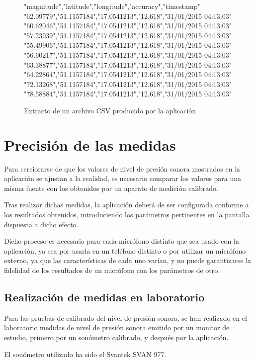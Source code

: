 \begin{figure}[h] \centering
\begin{boxedverbatim}
"magnitude","latitude","longitude","accuracy","timestamp"
"62.09779","51.1157184","17.0541213","12.618","31/01/2015 04:13:03"
"60.62046","51.1157184","17.0541213","12.618","31/01/2015 04:13:03"
"57.23939","51.1157184","17.0541213","12.618","31/01/2015 04:13:03"
"55.49906","51.1157184","17.0541213","12.618","31/01/2015 04:13:03"
"56.60217","51.1157184","17.0541213","12.618","31/01/2015 04:13:03"
"63.38877","51.1157184","17.0541213","12.618","31/01/2015 04:13:03"
"64.22864","51.1157184","17.0541213","12.618","31/01/2015 04:13:03"
"72.13268","51.1157184","17.0541213","12.618","31/01/2015 04:13:03"
"78.58884","51.1157184","17.0541213","12.618","31/01/2015 04:13:03"
\end{boxedverbatim}
\caption{Extracto de un archivo CSV producido por la aplicación}
\label{fig:dump:file}
\end{figure}

\section{Precisión de las medidas}
    Para cerciorarse de que los valores de nivel de presión sonora mostrados en la aplicación se ajustan a la realidad, es necesario comparar los valores para una misma fuente con los obtenidos por un aparato de medición calibrado.

    Tras realizar dichas medidas, la aplicación deberá de ser configurada conforme a los resultados obtenidos, introduciendo los parámetros pertinentes en la pantalla dispuesta a dicho efecto.

    Dicho proceso es necesario para cada micrófono distinto que sea usado con la aplicación, ya sea por usarla en un teléfono distinto o por utilizar un micrófono externo, ya que las características de cada uno varían, y no puede garantizarse la fidelidad de los resultados de un micrófono con los parámetros de otro.
    
\subsection{Realización de medidas en laboratorio}
    Para las pruebas de calibrado del nivel de presión sonora, se han realizado en el laboratorio medidas de nivel de presión sonora emitido por un monitor de estudio, primero por un sonómetro calibrado, y después por la aplicación.

    El sonómetro utilizado ha sido el Svantek SVAN 977.

